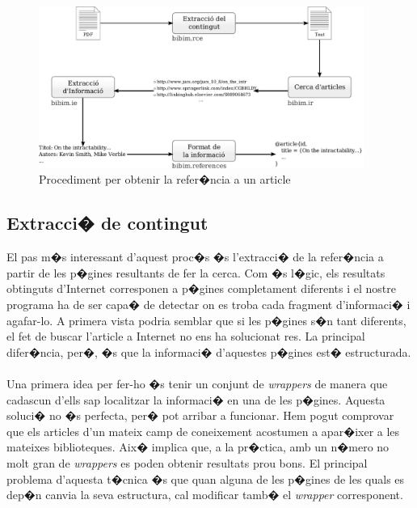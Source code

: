 \documentclass[a4paper,oneside]{article}
\begin{document}
\begin{figure}[H]
\begin{center}
\includegraphics[width=0.95\textwidth]{images/process_diagram.pdf}
\caption{Procediment per obtenir la refer�ncia a un article}
\label{fig:process_diagram}
\end{center}
\end{figure}

\subsection{Extracci� de contingut}
El pas m�s interessant d'aquest proc�s �s l'extracci� de la refer�ncia a partir de les p�gines resultants de fer la cerca. Com �s l�gic, els resultats obtinguts d'Internet corresponen a p�gines completament diferents i el nostre programa ha de ser capa� de detectar on es troba cada fragment d'informaci� i agafar-lo. A primera vista podria semblar que si les p�gines s�n tant diferents, el fet de buscar l'article a Internet no ens ha solucionat res. La principal difer�ncia, per�, �s que la informaci� d'aquestes p�gines est� estructurada.

\paragraph{}
Una primera idea per fer-ho �s tenir un conjunt de \textit{wrappers} de manera que cadascun d'ells sap localitzar la informaci� en una de les p�gines. Aquesta soluci� no �s perfecta, per� pot arribar a funcionar. Hem pogut comprovar que els articles d'un mateix camp de coneixement acostumen a apar�ixer a les mateixes biblioteques. Aix� implica que, a la pr�ctica, amb un n�mero no molt gran de \textit{wrappers} es poden obtenir resultats prou bons. El principal problema d'aquesta t�cnica �s que quan alguna de les p�gines de les quals es dep�n canvia la seva estructura, cal modificar tamb� el \textit{wrapper} corresponent.
\end{document}
